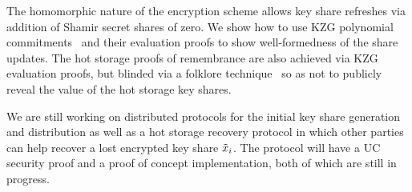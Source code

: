 The homomorphic nature of the encryption scheme allows key share refreshes via addition of Shamir secret shares of zero. We show how to use KZG polynomial commitments~\cite{AC:KatZavGol10} and their evaluation proofs to show well-formedness of the share updates. The hot storage proofs of remembrance are also achieved via KZG evaluation proofs, but blinded via a folklore technique~\cite[\S2.5]{EC:CHMMVW20} so as not to publicly reveal the value of the hot storage key shares.

We are still working on distributed protocols for the initial key share generation and distribution as well as a hot storage recovery protocol in which other parties can help recover a lost encrypted key share $\tilde{x}_i$.
The protocol will have a UC security proof and a proof of concept implementation, both of which are still in progress.